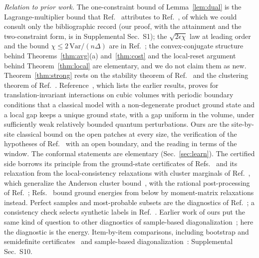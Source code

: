 \documentclass[aps,prx,twocolumn,10pt,superscriptaddress,nofootinbib,longbibliography,floatfix]{revtex4-2}
\theoremstyle{remark}
\begin{document}
\emph{Relation to prior work.} The one-constraint bound of Lemma~\ref{lem:dual} is the Lagrange-multiplier bound that Ref.~\cite{manchanda2026}
attributes to Ref.~\cite{cohen1971}, of which we could consult only the bibliographic record (our proof, with the
attainment and the two-constraint form, is in Supplemental Sec.~S1); the
$\sqrt{2\epsilon\chi}$ law at leading order and the bound $\chi\le2\,\mathrm{Var}/(n\Delta)$ are in
Ref.~\cite{manchanda2026}; the convex-conjugate structure behind Theorems~\ref{thm:avg}(a) and~\ref{thm:cost} and
the local-reset argument behind Theorem~\ref{thm:local} are elementary, and we do not claim them as new.
Theorem~\ref{thm:strong} rests on the stability theorem of Ref.~\cite{nsy2022} and the clustering theorem of
Ref.~\cite{nachtergaele2006}. Reference~\cite{yarotsky2006}, which lists the earlier results, proves for
translation-invariant interactions on cubic volumes with periodic boundary conditions that a classical model with
a non-degenerate product ground state and a local gap keeps a unique ground state, with a gap uniform in the
volume, under sufficiently weak relatively bounded quantum perturbations. Ours are the
site-by-site classical bound on the open patches at every size, the
verification of the hypotheses of Ref.~\cite{nsy2022} with an open boundary, and the reading in terms of the window. The conformal
statements are elementary (Sec.~\ref{sec:learn}). The certified
side borrows its principle from the ground-state
certificates of Refs.~\cite{wang2024prx,wang2026scipost} and its relaxation from the local-consistency
relaxations with cluster marginals of Ref.~\cite{lin2026}, which generalize the Anderson cluster
bound~\cite{anderson1951}, with the rational post-processing of Ref.~\cite{naceur2025};
Refs.~\cite{barthel2012,baumgratz2012} bound ground energies from below by moment-matrix relaxations instead. Perfect samples and most-probable subsets are the diagnostics of Ref.~\cite{gaberle2026}; a consistency check selects synthetic labels in Ref.~\cite{wang2025aide}. Earlier work of ours put the same kind of question to other diagnostics of sample-based
diagonalization~\cite{bonilla2026review,bonilla2026spectral}; here the diagnostic is the energy.
Item-by-item comparisons, including bootstrap and semidefinite certificates~\cite{scheer2025}
and sample-based diagonalization~\cite{biswas2025}: Supplemental Sec.~S10.
\end{document}
